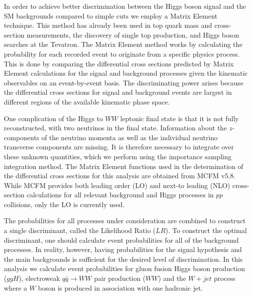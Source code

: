 In order to achieve better discrimination between the Higgs boson signal and the SM backgrounds
compared to simple cuts we employ a Matrix Element technique. 
This method has already been used in top quark mass and cross-section 
measurements, the discovery of single top production, and Higgs boson searches at the Tevatron.  
The Matrix Element method works by calculating the probability for each recorded
event to originate from a specific physics process.
This is done by comparing the differential cross sections predicted by Matrix Element 
calculations for the signal and background processes given the kinematic observables
on an event-by-event basis.
The discriminating power arises because the differential cross sections for 
signal and background events are largest in different regions of the available
kinematic phase space. 

One complication of the Higgs to $WW$ leptonic final state is that it is not fully 
reconstructed, with two neutrinos in the final state. 
Information about the $z$-components of the neutrino momenta as well as the individual 
neutrino transverse components are missing. It is therefore necessary to integrate 
over these unknown quantities, which we perform using the importance sampling 
integration method.
The Matrix Element functions used in the determination of the differential cross sections
for this analysis are obtained from  MCFM v5.8.  While MCFM 
provides both leading order (LO) and next-to leading (NLO) cross-section calculations for 
all relevant background and Higgs processes in $pp$ collisions, only the
LO is currently used.

The probabilities for all processes under consideration are combined 
to construct a single discriminant, called the Likelihood Ratio ($LR$).  
To construct the optimal discriminant, one should calculate 
event probabilities for all of the background processes. In reality, however, having 
probabilities for the signal hypothesis and the main backgrounds is sufficient for the 
desired level of discrimination. In this analysis we calculate event probabilities 
for gluon fusion Higgs boson production ($ggH$), electroweak $q\bar{q}\rightarrow WW$ pair 
production ($WW$) and the $W+jet$ process where a $W$ boson is produced in association with one hadronic jet. 


